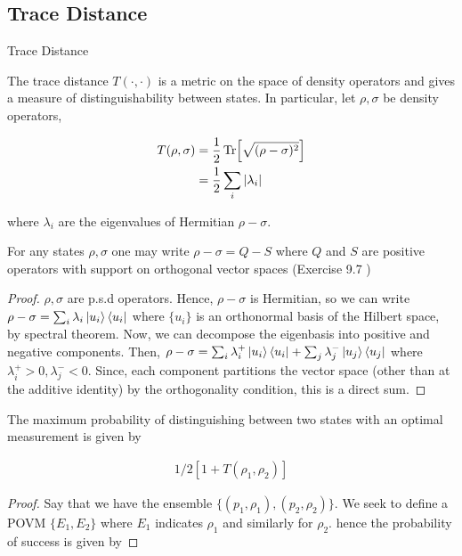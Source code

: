 \documentclass[main.tex]{subfiles}
\begin{document}
\begin{subappendices}
\subsection{Trace Distance}

\begin{definition}
Trace Distance

The trace distance $T(\cdot , \cdot)$ is a metric on the space of density operators and gives a measure of distinguishability between states. In particular, let $\rho, \sigma$ be density operators,

\begin{align*}
	T(\rho, \sigma) &= \frac{1}{2} \Tr [\sqrt{(\rho - \sigma)^2}] \\
	&= \frac{1}{2} \sum_i |\lambda_i|
\end{align*}

where $\lambda_i$ are the eigenvalues of Hermitian $\rho - \sigma$.

\end{definition}

\begin{lemma}
For any states $\rho, \sigma$ one may write $\rho - \sigma = Q - S$ where $Q$ and $S$ are positive operators with support on orthogonal vector spaces	(Exercise 9.7 \cite{nielsen2010quantum})
\end{lemma}

\begin{proof}
$\rho, \sigma$ are p.s.d operators. Hence, $\rho - \sigma$ is Hermitian, so we can write $\rho - \sigma = \sum_i \lambda_i \ket{u_i}\bra{u_i}$ where $\{ u_i \}$ is an orthonormal basis of the Hilbert space, by spectral theorem. Now, we can decompose the eigenbasis into positive and negative components. Then, $\rho - \sigma = \sum_i \lambda^+_i \ket{u_i}\bra{u_i} + \sum_j \lambda^-_j\ket{u_j}\bra{u_j}$ where $\lambda^+_i >0, \lambda^-_j < 0$. Since, each component partitions the vector space (other than at the additive identity) by the orthogonality condition, this is a direct sum.
\end{proof}


\begin{lemma}
The maximum probability of distinguishing between two states with an optimal measurement is given by

\begin{align*}
	1/2[1 + T(\rho_1, \rho_2)]
\end{align*}
	
\end{lemma}
\begin{proof}
Say that we have the ensemble $\{ (p_1, \rho_1), (p_2, \rho_2)\}$. We seek to define a POVM $\{E_1, E_2 \}$ where $E_1$ indicates $\rho_1$ and similarly for $\rho_2$. hence the probability of success is given by


\end{proof}
\end{subappendices}
\end{document}
